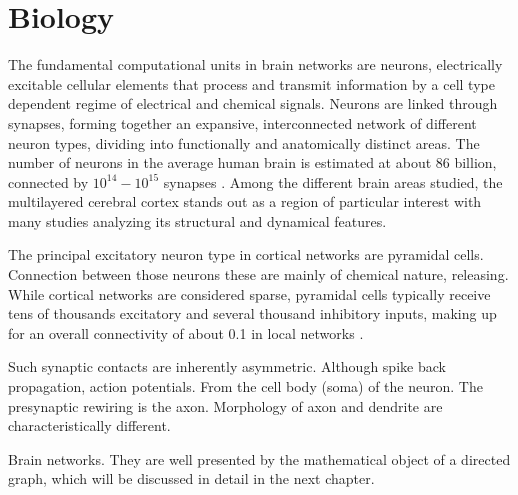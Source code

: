\chapter{Biology}\label{ch:Biology} 


The fundamental computational units in brain networks are
neurons, electrically excitable cellular elements that
process and transmit information by a cell type dependent regime of
electrical and chemical signals. Neurons are linked through
synapses, forming together an expansive, interconnected
network of different neuron types, dividing into functionally and
anatomically distinct areas. The number of neurons in the average
human brain is estimated at about 86 billion, connected by
$10^{14}-10^{15}$ synapses \parencite{Herculano2009,
  Drachman2005}. Among the different brain areas studied, the
multilayered cerebral cortex stands out as a region of
particular interest with many studies analyzing its structural and
dynamical features.

The principal excitatory neuron type in cortical
networks are pyramidal cells. Connection between those neurons these are mainly of chemical
nature, releasing. While cortical networks are considered sparse,
pyramidal cells typically receive tens of thousands excitatory and
several thousand inhibitory inputs, making up for an overall
connectivity of about 0.1 in local networks \parencite{Spruston2009}.

Such synaptic contacts are inherently asymmetric. Although spike back
propagation, action potentials. From the cell body (soma)
of the neuron. The presynaptic rewiring is the axon. Morphology of
axon and dendrite are characteristically different.

Brain networks. They are well presented by the mathematical object of
a directed graph, which will be discussed in detail in the next
chapter.

